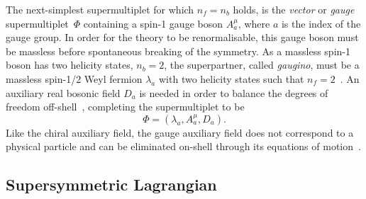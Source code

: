 The next-simplest supermultiplet for which $n_f = n_b$ holds, is the \textit{vector} or \textit{gauge} supermultiplet~$\Phi$ containing a spin-1 gauge boson $A^\mu_a$, where $a$ is the index of the gauge group. In order for the theory to be renormalisable, this gauge boson must be massless before spontaneous breaking of the symmetry. As a massless spin-1 boson has two helicity states, $n_b = 2$, the superpartner, called \textit{gaugino}, must be a massless spin-1/2 Weyl fermion $\lambda_a$ with two helicity states such that $n_f = 2$~\cite{Martin:1997ns}. An auxiliary real bosonic field $D_a$ is needed in order to balance the degrees of freedom off-shell~\cite{Bustamante:2009us}, completing the supermultiplet to be
\begin{equation}
	\Phi = (\lambda_a,A^\mu_a,D_a).
\end{equation}
 Like the chiral auxiliary field, the gauge auxiliary field does not correspond to a physical particle and can be eliminated on-shell through its equations of motion~\cite{Martin:1997ns}.

\subsection{Supersymmetric Lagrangian}\label{sec:susy_lagrangian}

